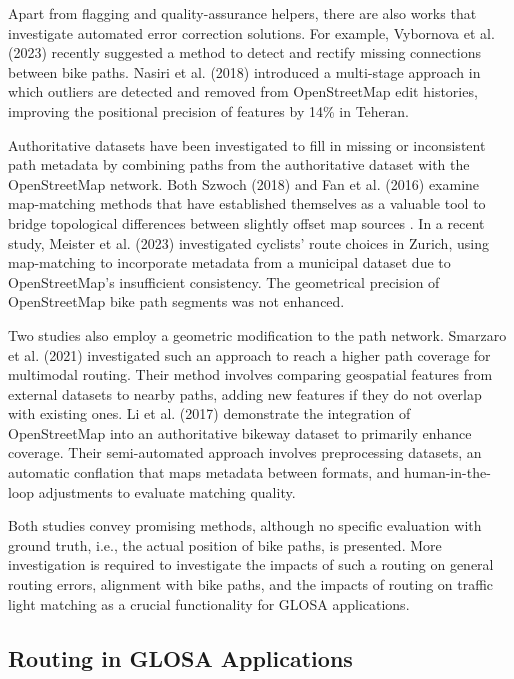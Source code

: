 Apart from flagging and quality-assurance helpers, there are also works that investigate automated error correction solutions. For example, Vybornova et al. (2023) \cite{vybornova_automated_2023} recently suggested a method to detect and rectify missing connections between bike paths. Nasiri et al. (2018) \cite{nasiri_improving_2018} introduced a multi-stage approach in which outliers are detected and removed from OpenStreetMap edit histories, improving the positional precision of features by 14\% in Teheran.  

Authoritative datasets have been investigated to fill in missing or inconsistent path metadata by combining paths from the authoritative dataset with the OpenStreetMap network. Both Szwoch (2018) \cite{szwoch_combining_2019} and Fan et al. (2016) \cite{fan_polygon-based_2016} examine map-matching methods that have established themselves as a valuable tool to bridge topological differences between slightly offset map sources \cite{chao_survey_2020}. In a recent study, Meister et al. (2023) \cite{meister_route_2023} investigated cyclists' route choices in Zurich, using map-matching to incorporate metadata from a municipal dataset due to OpenStreetMap's insufficient consistency. The geometrical precision of OpenStreetMap bike path segments was not enhanced.

Two studies also employ a geometric modification to the path network. Smarzaro et al. (2021) \cite{smarzaro_creation_2021} investigated such an approach to reach a higher path coverage for multimodal routing. Their method involves comparing geospatial features from external datasets to nearby paths, adding new features if they do not overlap with existing ones. Li et al. (2017) \cite{li_optimized_2017} demonstrate the integration of OpenStreetMap into an authoritative bikeway dataset to primarily enhance coverage. Their semi-automated approach involves preprocessing datasets, an automatic conflation that maps metadata between formats, and human-in-the-loop adjustments to evaluate matching quality. 

Both studies convey promising methods, although no specific evaluation with ground truth, i.e., the actual position of bike paths, is presented. More investigation is required to investigate the impacts of such a routing on general routing errors, alignment with bike paths, and the impacts of routing on traffic light matching as a crucial functionality for GLOSA applications.

\subsection{Routing in GLOSA Applications}

